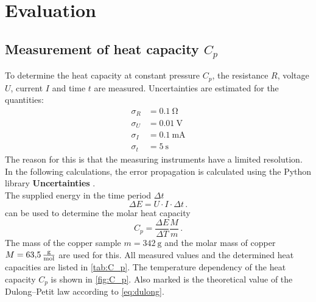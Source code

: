 \section{Evaluation}
\label{sec:evaluation}

\subsection{Measurement of heat capacity $C_p$}
To determine the heat capacity at constant pressure $C_p$, the resistance $R$, voltage $U$, current $I$ and time $t$ are measured.
Uncertainties are estimated for the quantities:
\begin{align*}
    \sigma_R &= \qty{0.1}{\ohm} \\
    \sigma_U &= \qty{0.01}{\volt}\\
    \sigma_I &= \qty{0.1}{\milli\ampere} \\
    \sigma_t &= \qty{5}{\second}
\end{align*}
The reason for this is that the measuring instruments have a limited resolution.
In the following calculations, the error propagation is calculated using the Python library \textbf{Uncertainties} \cite{uncertainties}.
\\
The supplied energy in the time period $\Delta t$
\begin{equation}
    \Delta E = U \cdot I \cdot \Delta t \, .
\end{equation}
can be used to determine the molar heat capacity
\begin{equation}
    C_p = \frac{\Delta E}{\Delta T} \frac{M}{m} \,.
\end{equation}
The mass of the copper sample $m = \qty{342}{\gram}$ \cite{V47} and the molar mass of copper $M = \qty{63.5}{\frac{\gram}{\mol}}$ \cite{goodfellow} are used for this.
All measured values and the determined heat capacities are listed in \autoref{tab:C_p}.
The temperature dependency of the heat capacity $C_p$ is shown in \autoref{fig:C_p}.
Also marked is the theoretical value of the Dulong–Petit law according to \autoref{eq:dulong}.
